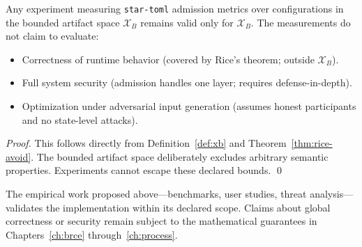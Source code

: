 \begin{theorem}
\label{thm:experiment-validity}
Any experiment measuring \texttt{star-toml} admission metrics over
configurations in the bounded artifact space $\mathcal{X}_B$
remains valid only for $\mathcal{X}_B$.
The measurements do not claim to evaluate:
\begin{itemize}
  \item Correctness of runtime behavior (covered by Rice's theorem;
        outside $\mathcal{X}_B$).
  \item Full system security (admission handles one layer; requires
        defense-in-depth).
  \item Optimization under adversarial input generation
        (assumes honest participants and no state-level attacks).
\end{itemize}
\end{theorem}

\begin{proof}
This follows directly from Definition~\ref{def:xb} and Theorem~\ref{thm:rice-avoid}.
The bounded artifact space deliberately excludes arbitrary semantic properties.
Experiments cannot escape these declared bounds. \qed
\end{proof}

The empirical work proposed above---benchmarks, user studies, threat analysis---
validates the implementation within its declared scope. Claims about global
correctness or security remain subject to the mathematical guarantees in
Chapters~\ref{ch:brce} through~\ref{ch:process}.
